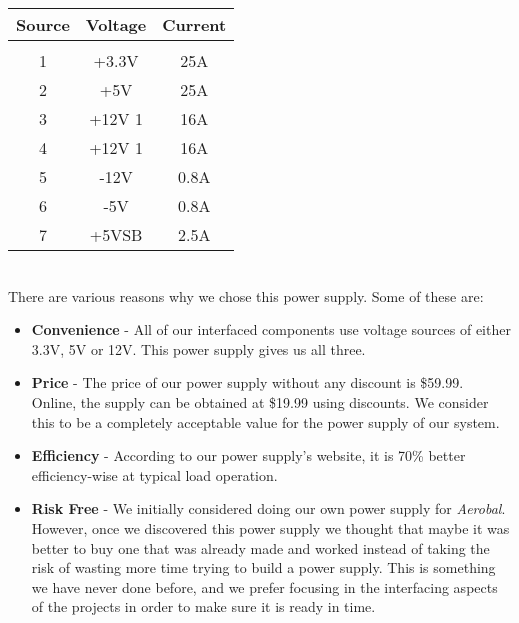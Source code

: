 		\begin{tabular}{|c|c|c|}
		\hline
		Source & Voltage & Current  \\
		\hline
		& & \\
		1 & +3.3V & 25A  \\
		2 & +5V & 25A  \\
		3 & +12V 1 & 16A  \\
		4 & +12V 1 & 16A  \\
		5 & -12V & 0.8A  \\
		6 & -5V & 0.8A  \\
		7 & +5VSB & 2.5A  \\
		\hline
		\end{tabular} \\

		There are various reasons why we chose this power supply. Some of these are: 

		\begin{itemize}
		  \item \textbf{Convenience} - All of our interfaced components use voltage sources of either 3.3V, 5V or 12V. This power supply gives us all three. 
		  \item \textbf{Price} - The price of our power supply without any discount is \$59.99. Online, the supply can be obtained at \$19.99 using discounts. We consider this to be a completely acceptable value for the power supply of our system. 
		  \item \textbf{Efficiency} - According to our power supply's website, it is 70\% better efficiency-wise at typical load operation.
		  \item \textbf{Risk Free} - We initially considered doing our own power supply for \textit{Aerobal}. However, once we discovered this power supply we thought that maybe it was better to buy one that was already made and worked instead of taking the risk of wasting more time trying to build a power supply. This is something we have never done before, and we prefer focusing in the interfacing aspects of the projects in order to make sure it is ready in time.

		\end{itemize} 

\newpage